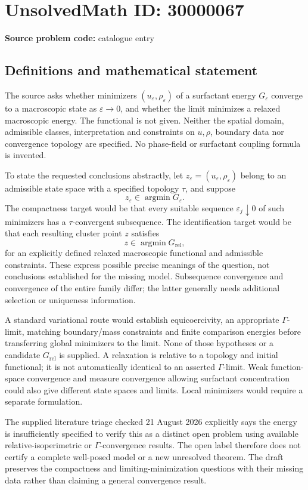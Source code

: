 \documentclass[11pt]{article}
\begin{document}
\section*{UnsolvedMath ID: 30000067}
\textbf{Source problem code:} catalogue entry
\subsection{Definitions and mathematical statement}
The source asks whether minimizers $(u_\varepsilon,\rho_\varepsilon)$ of a surfactant energy $G_\varepsilon$ converge to a macroscopic state as $\varepsilon\to0$, and whether the limit minimizes a relaxed macroscopic energy. The functional is not given. Neither the spatial domain, admissible classes, interpretation and constraints on $u,\rho$, boundary data nor convergence topology are specified. No phase-field or surfactant coupling formula is invented.

To state the requested conclusions abstractly, let $z_\varepsilon=(u_\varepsilon,\rho_\varepsilon)$ belong to an admissible state space with a specified topology $\tau$, and suppose
\[
 z_\varepsilon\in\operatorname*{argmin}G_\varepsilon.
\]
The compactness target would be that every suitable sequence $\varepsilon_j\downarrow0$ of such minimizers has a $\tau$-convergent subsequence. The identification target would be that each resulting cluster point $z$ satisfies
\[
 z\in\operatorname*{argmin}G_{\mathrm{rel}},
\]
for an explicitly defined relaxed macroscopic functional and admissible constraints. These express possible precise meanings of the question, not conclusions established for the missing model. Subsequence convergence and convergence of the entire family differ; the latter generally needs additional selection or uniqueness information.

A standard variational route would establish equicoercivity, an appropriate $\Gamma$-limit, matching boundary/mass constraints and finite comparison energies before transferring global minimizers to the limit. None of those hypotheses or a candidate $G_{\mathrm{rel}}$ is supplied. A relaxation is relative to a topology and initial functional; it is not automatically identical to an asserted $\Gamma$-limit. Weak function-space convergence and measure convergence allowing surfactant concentration could also give different state spaces and limits. Local minimizers would require a separate formulation.

The supplied literature triage checked 21 August 2026 explicitly says the energy is insufficiently specified to verify this as a distinct open problem using available relative-isoperimetric or $\Gamma$-convergence results. The open label therefore does not certify a complete well-posed model or a new unresolved theorem. The draft preserves the compactness and limiting-minimization questions with their missing data rather than claiming a general convergence result.
\end{document}
